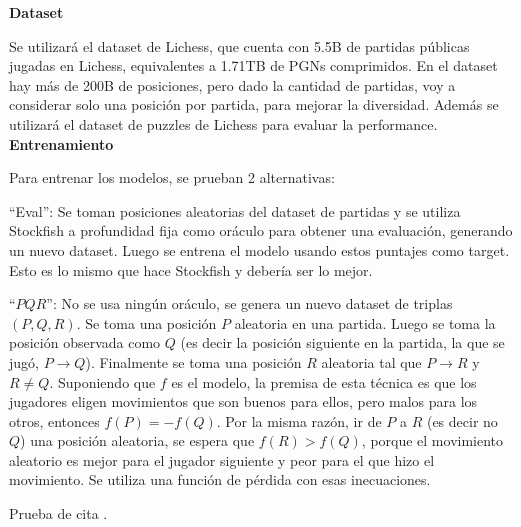\textbf{Dataset}

Se utilizará el dataset de Lichess, que cuenta con 5.5B de partidas públicas jugadas en Lichess, equivalentes a 1.71TB de PGNs comprimidos. En el dataset hay más de 200B de posiciones, pero dado la cantidad de partidas, voy a considerar solo una posición por partida, para mejorar la diversidad. Además se utilizará el dataset de puzzles de Lichess para evaluar la performance. \\

\textbf{Entrenamiento}

Para entrenar los modelos, se prueban 2 alternativas:

``Eval'': Se toman posiciones aleatorias del dataset de partidas y se utiliza Stockfish a profundidad fija como oráculo para obtener una evaluación, generando un nuevo dataset. Luego se entrena el modelo usando estos puntajes como target. Esto es lo mismo que hace Stockfish y debería ser lo mejor.

``$PQR$'': No se usa ningún oráculo, se genera un nuevo dataset de triplas $(P,Q,R)$. Se toma una posición $P$ aleatoria en una partida. Luego se toma la posición observada como $Q$ (es decir la posición siguiente en la partida, la que se jugó, $P \rightarrow Q$). Finalmente se toma una posición $R$ aleatoria tal que $P \rightarrow R$ y $R \neq Q$. Suponiendo que $f$ es el modelo, la premisa de esta técnica es que los jugadores eligen movimientos que son buenos para ellos, pero malos para los otros, entonces $f(P)=-f(Q)$. Por la misma razón, ir de $P$ a $R$ (es decir no $Q$) una posición aleatoria, se espera que $f(R) > f(Q)$, porque el movimiento aleatorio es mejor para el jugador siguiente y peor para el que hizo el movimiento. Se utiliza una función de pérdida con esas inecuaciones.

Prueba de cita \cite{knuth:1984}.
